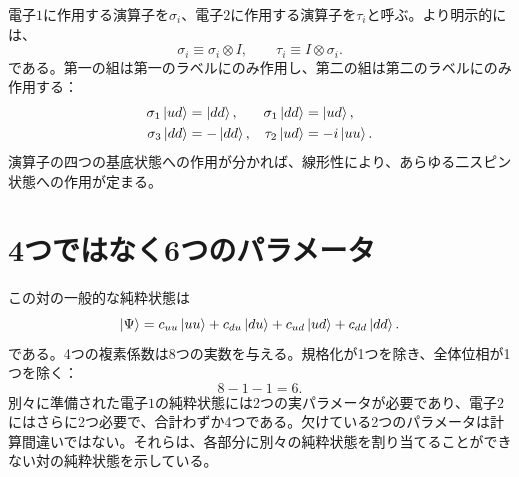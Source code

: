 電子\(1\)に作用する演算子を\(\sigma_i\)、電子\(2\)に作用する演算子を\(\tau_i\)と呼ぶ。より明示的には、
\begin{equation}
  \sigma_i\equiv\sigma_i\otimes I,
  \qquad
  \tau_i\equiv I\otimes\sigma_i.
\end{equation}
である。第一の組は第一のラベルにのみ作用し、第二の組は第二のラベルにのみ作用する：
\begin{align}
  \sigma_1\left\lvert ud\right\rangle&=\left\lvert dd\right\rangle,
  &
  \sigma_1\left\lvert dd\right\rangle&=\left\lvert ud\right\rangle,
  \notag\\
  \sigma_3\left\lvert dd\right\rangle&=-\left\lvert dd\right\rangle,
  &
  \tau_2\left\lvert ud\right\rangle&=-i\left\lvert uu\right\rangle.
  \label{eq:l04-local-operator-examples}
\end{align}
演算子の四つの基底状態への作用が分かれば、線形性により、あらゆる二スピン状態への作用が定まる。

\begin{classroomqa}
\end{classroomqa}

\begin{classroomqa}
\end{classroomqa}

\section{4つではなく6つのパラメータ}

この対の一般的な純粋状態は
\begin{equation}
  \left\lvert\Psi\right\rangle
  =
  c_{uu}\left\lvert uu\right\rangle
  +c_{du}\left\lvert du\right\rangle
  +c_{ud}\left\lvert ud\right\rangle
  +c_{dd}\left\lvert dd\right\rangle.
  \label{eq:l04-general-two-spin-state}
\end{equation}
である。4つの複素係数は8つの実数を与える。規格化が1つを除き、全体位相が1つを除く：
\begin{equation}
  8-1-1=6.
  \label{eq:l04-two-spin-parameter-count}
\end{equation}
別々に準備された電子\(1\)の純粋状態には2つの実パラメータが必要であり、電子\(2\)にはさらに2つ必要で、合計わずか4つである。欠けている2つのパラメータは計算間違いではない。それらは、各部分に別々の純粋状態を割り当てることができない対の純粋状態を示している。

